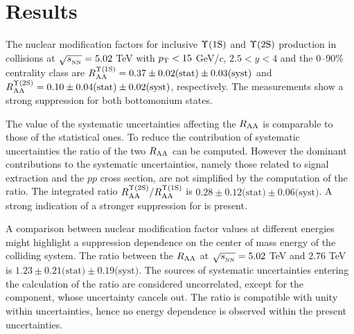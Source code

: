 
\section{Results}\label{section:results}

The nuclear modification factors for  inclusive $\mbox{$\Upsilon$(1S)}$ and $\mbox{$\Upsilon$(2S)}$ production in \pbpb collisions at $\sqrt{s_{_{\rm NN}}}=5.02$ \rm{TeV} with $p_{\rm T} < 15$ GeV/$c$, $2.5 < y < 4$ and the 0--90\% centrality class are $R_{\rm{AA}}^{\Upsilon(\rm1S)}=0.37\pm0.02\text{(stat)}\pm0.03\text{(syst)}$  and $R_{\rm{AA}}^{\Upsilon(\rm2S)}=0.10\pm{0.04}\text{(stat)}\pm{0.02}\text{(syst)}$, respectively. 
The measurements show a strong suppression for both bottomonium states.

The value of the systematic uncertainties affecting the $R_{\rm{AA}}$ is comparable to those of the statistical ones.
To reduce the contribution of systematic uncertainties the ratio of the two $R_{\rm{AA}}$ can be computed.
However the dominant contributions to the systematic uncertainties, namely those related to signal extraction and the $pp$ cross section, are not simplified by the computation of the ratio.
The integrated ratio $R_{\rm{AA}}^{\Upsilon(\rm2S)}/R_{\rm{AA}}^{\Upsilon(\rm1S)}$ is $0.28\pm0.12\text{(stat)}\pm0.06\text{(syst)}$. 
A strong indication of a stronger suppression for \upsiss is present.

A comparison between \upsis nuclear modification factor values at different energies might highlight a suppression dependence on the center of mass energy of the colliding system.
The ratio between the \upsis $\mbox{$R_{\rm{AA}}$}$ at $\sqrt{s_{_{\rm NN}}}=5.02$ \rm{TeV} and $2.76$ \rm{TeV} is $1.23\pm0.21\text{(stat)}\pm0.19\text{(syst)}$. 
The sources of systematic uncertainties entering the calculation of the ratio are considered uncorrelated, except for the \taa component, whose uncertainty cancels out. 
The ratio is compatible with unity within uncertainties, hence no energy dependence is observed within the present uncertainties.

